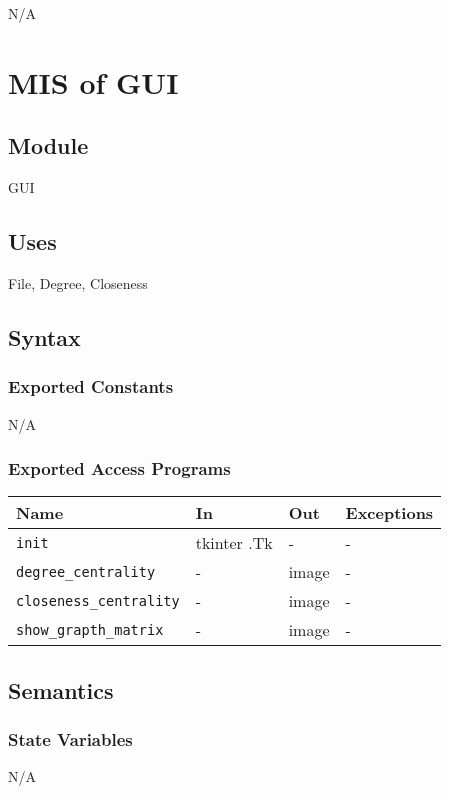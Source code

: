 \documentclass[12pt, titlepage]{article}
\begin{document}
N/A
\newpage

\section{MIS of GUI} \label{Module} 


\subsection{Module}
GUI 

\subsection{Uses}
File, Degree, Closeness
\subsection{Syntax}

\subsubsection{Exported Constants}
N/A
\subsubsection{Exported Access Programs}
\begin{center}
\begin{tabular}{p{6cm} p{4cm} p{4cm} p{2cm}}
\hline
\textbf{Name} & \textbf{In} & \textbf{Out} & \textbf{Exceptions} \\
\hline
\texttt{init} & tkinter .Tk & - & - \\
\texttt{degree\_centrality} & - & image& - \\
\texttt{closeness\_centrality} & - & image & - \\
\texttt{show\_grapth\_matrix} & - & image & - \\
\hline
\end{tabular}
\end{center}


\subsection{Semantics}

\subsubsection{State Variables}

N/A
\end{document}
